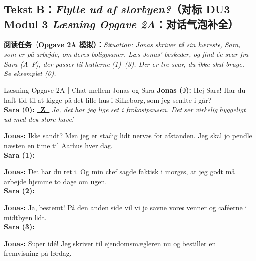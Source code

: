 \subsection*{Tekst B：\textit{Flytte ud af storbyen?}（对标 DU3 Modul 3 \textit{Læsning Opgave 2A}：对话气泡补全）}

\textbf{阅读任务（Opgave 2A 模拟）：}\textit{Situation: Jonas skriver til sin kæreste, Sara, som er på arbejde, om deres boligplaner. Læs Jonas' beskeder, og find de svar fra Sara (A--F), der passer til hullerne (1)--(3). Der er tre svar, du ikke skal bruge. Se eksemplet (0).}

\begin{emailbox}{Læsning Opgave 2A｜Chat mellem Jonas og Sara}
\textbf{Jonas (0):} Hej Sara! Har du haft tid til at kigge på det lille hus i Silkeborg, som jeg sendte i går?\\
\textbf{Sara (0):} \textbf{\underline{\ Z\ }} \textit{Ja, det har jeg lige set i frokostpausen. Det ser virkelig hyggeligt ud med den store have!}

\vspace{0.3em}
\textbf{Jonas:} Ikke sandt? Men jeg er stadig lidt nervøs for afstanden. Jeg skal jo pendle næsten en time til Aarhus hver dag.\\
\textbf{Sara (1):} \underline{\hspace{1.2cm}}

\vspace{0.3em}
\textbf{Jonas:} Det har du ret i. Og min chef sagde faktisk i morges, at jeg godt må arbejde hjemme to dage om ugen.\\
\textbf{Sara (2):} \underline{\hspace{1.2cm}}

\vspace{0.3em}
\textbf{Jonas:} Ja, bestemt! På den anden side vil vi jo savne vores venner og caféerne i midtbyen lidt.\\
\textbf{Sara (3):} \underline{\hspace{1.2cm}}

\vspace{0.3em}
\textbf{Jonas:} Super idé! Jeg skriver til ejendomsmægleren nu og bestiller en fremvisning på lørdag.


\end{emailbox}
